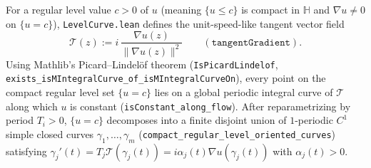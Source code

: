 \documentclass[11pt,reqno]{amsart}
\theoremstyle{definition}
\newcommand{\uhp}{\mathbb{H}}
\begin{document}
For a regular level value $c > 0$ of $u$ (meaning $\{u \le c\}$ is compact in $\uhp$ and $\nabla u \ne 0$ on $\{u = c\}$), \texttt{LevelCurve.lean} defines the unit-speed-like tangent vector field
\[
\mathcal{T}(z) := i\,\frac{\nabla u(z)}{\|\nabla u(z)\|^2} \qquad (\texttt{tangentGradient}).
\]
Using Mathlib's Picard--Lindel\"of theorem (\texttt{IsPicardLindelof}, \texttt{exists\_isMIntegralCurve\_of\_isMIntegralCurveOn}), every point on the compact regular level set $\{u = c\}$ lies on a global periodic integral curve of $\mathcal{T}$ along which $u$ is constant (\texttt{isConstant\_along\_flow}). After reparametrizing by period $T_i > 0$, $\{u = c\}$ decomposes into a finite disjoint union of $1$-periodic $C^1$ simple closed curves $\gamma_1, \dots, \gamma_m$ (\texttt{compact\_regular\_level\_oriented\_curves}) satisfying $\gamma_j'(t) = T_j \mathcal{T}(\gamma_j(t)) = i \alpha_j(t) \nabla u(\gamma_j(t))$ with $\alpha_j(t) > 0$.
\end{document}

